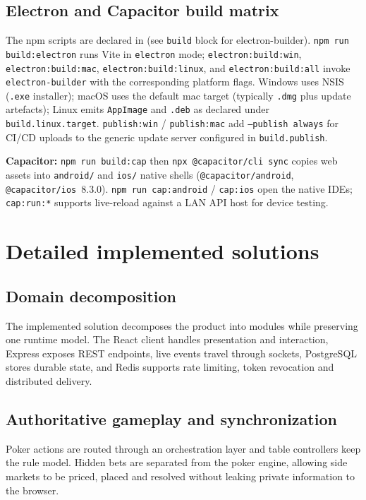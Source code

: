 \documentclass[11pt,a4paper]{article}
\begin{document}
\subsection{Electron and Capacitor build matrix}

The npm scripts are declared in  (see \texttt{build} block for electron-builder). \texttt{npm run build:electron} runs Vite in \texttt{electron} mode; \texttt{electron:build:win}, \texttt{electron:build:mac}, \texttt{electron:build:linux}, and \texttt{electron:build:all} invoke \texttt{electron-builder} with the corresponding platform flags. Windows uses NSIS (\texttt{.exe} installer); macOS uses the default mac target (typically \texttt{.dmg} plus update artefacts); Linux emits \texttt{AppImage} and \texttt{.deb} as declared under \texttt{build.linux.target}. \texttt{publish:win} / \texttt{publish:mac} add \texttt{--publish always} for CI/CD uploads to the generic update server configured in \texttt{build.publish}.

\textbf{Capacitor:} \texttt{npm run build:cap} then \texttt{npx @capacitor/cli sync} copies web assets into \texttt{android/} and \texttt{ios/} native shells (\texttt{@capacitor/android}, \texttt{@capacitor/ios}~8.3.0). \texttt{npm run cap:android} / \texttt{cap:ios} open the native IDEs; \texttt{cap:run:*} supports live-reload against a LAN API host for device testing.

\section{Detailed implemented solutions}
\label{app:implemented-solutions}

\subsection{Domain decomposition}

The implemented solution decomposes the product into modules while preserving one runtime model. The React client handles presentation and interaction, Express exposes REST endpoints, live events travel through sockets, PostgreSQL stores durable state, and Redis supports rate limiting, token revocation and distributed delivery.

\subsection{Authoritative gameplay and synchronization}

Poker actions are routed through an orchestration layer and table controllers keep the rule model. Hidden bets are separated from the poker engine, allowing side markets to be priced, placed and resolved without leaking private information to the browser.
\end{document}
